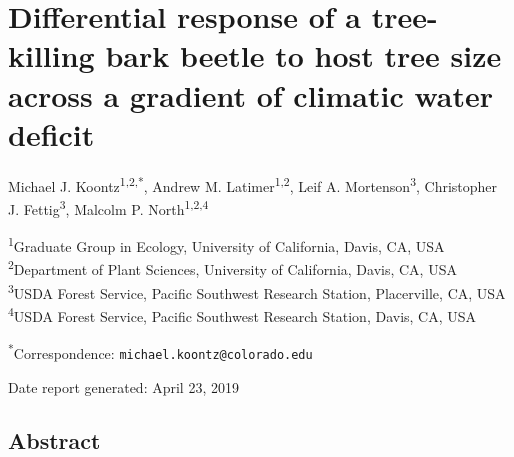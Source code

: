 \documentclass[]{article}
\title{}
\author{}
\date{}
\begin{document}
\section{Differential response of a tree-killing bark beetle to host
tree size across a gradient of climatic water
deficit}\label{differential-response-of-a-tree-killing-bark-beetle-to-host-tree-size-across-a-gradient-of-climatic-water-deficit}

Michael J. Koontz\textsuperscript{1,2,*}, Andrew M.
Latimer\textsuperscript{1,2}, Leif A. Mortenson\textsuperscript{3},
Christopher J. Fettig\textsuperscript{3}, Malcolm P.
North\textsuperscript{1,2,4}

\textsuperscript{1}Graduate Group in Ecology, University of California,
Davis, CA, USA\\
\textsuperscript{2}Department of Plant Sciences, University of
California, Davis, CA, USA\\
\textsuperscript{3}USDA Forest Service, Pacific Southwest Research
Station, Placerville, CA, USA\\
\textsuperscript{4}USDA Forest Service, Pacific Southwest Research
Station, Davis, CA, USA

\textsuperscript{*}Correspondence: \texttt{michael.koontz@colorado.edu}

Date report generated: April 23, 2019

\subsection{Abstract}\label{abstract}
\end{document}
